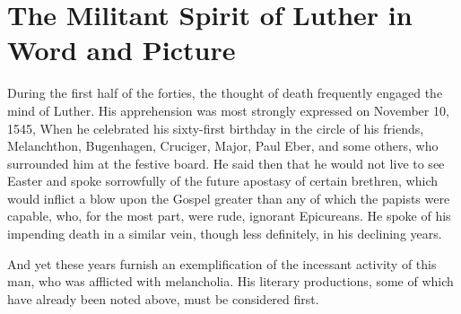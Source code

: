\section{The Militant Spirit of Luther in Word and Picture}

During the first half of the forties, the thought of death frequently
engaged the mind of Luther. His apprehension was most strongly expressed
on November 10, 1545, When he celebrated his sixty-first
birthday in the circle of his friends, Melanchthon, Bugenhagen, Cruciger,
Major, Paul Eber, and some others, who surrounded him at
the festive board. He said then that he would not live to see Easter
and spoke sorrowfully of the future apostasy of certain brethren,
which would inflict a blow upon the Gospel greater than any of which
the papists were capable, who, for the most part, were rude, ignorant
Epicureans. He spoke of his impending death in a similar vein, though
less definitely, in his declining years.

And yet these years furnish an exemplification of the incessant
activity of this man, who was afflicted with melancholia. His literary
productions, some of which have already been noted above, must be
considered first.

